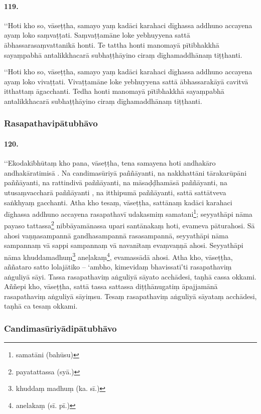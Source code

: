 \paragraph{119.} ‘‘Hoti kho so, vāseṭṭha, samayo yaṃ kadāci karahaci dīghassa addhuno accayena ayaṃ loko saṃvaṭṭati. Saṃvaṭṭamāne loke yebhuyyena sattā ābhassarasaṃvattanikā honti. Te tattha honti manomayā pītibhakkhā sayaṃpabhā antalikkhacarā subhaṭṭhāyino ciraṃ dīghamaddhānaṃ tiṭṭhanti.

‘‘Hoti kho so, vāseṭṭha, samayo yaṃ kadāci karahaci dīghassa addhuno accayena ayaṃ loko vivaṭṭati. Vivaṭṭamāne loke yebhuyyena sattā ābhassarakāyā cavitvā itthattaṃ āgacchanti. Tedha honti manomayā pītibhakkhā sayaṃpabhā antalikkhacarā subhaṭṭhāyino ciraṃ dīghamaddhānaṃ tiṭṭhanti.

\subsubsection{Rasapathavipātubhāvo}

\paragraph{120.} ‘‘Ekodakībhūtaṃ kho pana, vāseṭṭha, tena samayena hoti andhakāro andhakāratimisā . Na candimasūriyā paññāyanti, na nakkhattāni tārakarūpāni paññāyanti, na rattindivā paññāyanti, na māsaḍḍhamāsā paññāyanti, na utusaṃvaccharā paññāyanti , na itthipumā paññāyanti, sattā sattātveva saṅkhyaṃ gacchanti. Atha kho tesaṃ, vāseṭṭha, sattānaṃ kadāci karahaci dīghassa addhuno accayena rasapathavī udakasmiṃ samatani\footnote{samatāni (bahūsu)}; seyyathāpi nāma payaso tattassa\footnote{payatattassa (syā.)} nibbāyamānassa upari santānakaṃ hoti, evameva pāturahosi. Sā ahosi vaṇṇasampannā gandhasampannā rasasampannā, seyyathāpi nāma sampannaṃ vā sappi sampannaṃ vā navanītaṃ evaṃvaṇṇā ahosi. Seyyathāpi nāma khuddamadhuṃ\footnote{khuddaṃ madhuṃ (ka. sī.)} aneḷakaṃ\footnote{anelakaṃ (sī. pī.)}, evamassādā ahosi. Atha kho, vāseṭṭha, aññataro satto lolajātiko – ‘ambho, kimevidaṃ bhavissatī’ti rasapathaviṃ aṅguliyā sāyi. Tassa rasapathaviṃ aṅguliyā sāyato acchādesi, taṇhā cassa okkami. Aññepi kho, vāseṭṭha, sattā tassa sattassa diṭṭhānugatiṃ āpajjamānā rasapathaviṃ aṅguliyā sāyiṃsu. Tesaṃ rasapathaviṃ aṅguliyā sāyataṃ acchādesi, taṇhā ca tesaṃ okkami.

\subsubsection{Candimasūriyādipātubhāvo}

